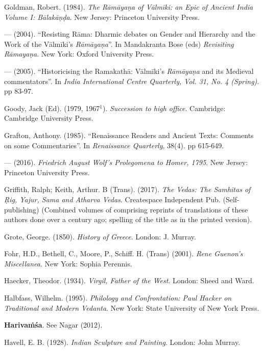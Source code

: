 \begin{thebibliography}{99}
Goldman, Robert. (1984). {\sl The Rāmāyaṇa of Vālmīki: an Epic of Ancient India Volume I: Bālakāṇḍa}. New Jersey: Princeton University Press. 

---  (2004). “Resisting Rāma: Dharmic debates on Gender and Hierarchy and the Work of the Vālmīki’s {\sl Rāmāyaṇa}”. In Mandakranta Bose (eds) {\sl Revisiting Rāmayaṇa}. New York: Oxford University Press. 

--- (2005). “Historicising the Ramakathā: Vālmīki's {\sl Rāmāyaṇa} and its Medieval commentators”. In {\sl India International Centre Quarterly, Vol. 31, No. 4 (Spring)}. pp 83-97.

Goody, Jack (Ed). (1979, 1967$^{1}$). {\sl Succession to high office}. Cambridge: Cambridge University Press. 

Grafton, Anthony. (1985). “Renaissance Readers and Ancient Texts: Comments on some Commentaries”. In {\sl Renaissance Quarterly}, 38(4). pp 615-649.

--- (2016). {\sl Friedrich August Wolf’s Prolegomena to Homer, 1795}.  New Jersey: Princeton University Press. 

Griffith, Ralph; Keith, Arthur. B (Trans). (2017). {\sl The Vedas: The Samhitas of Ṛig, Yajur, Sama and Atharva Vedas}. Createspace Independent Pub. (Self-publishing) (Combined volumes of comprising reprints of translations of these authors done over a century ago; spelling of the title as in the printed version).

Grote, George. (1850). {\sl History of Greece}.  London: J. Murray. 

Fohr, H.D., Bethell, C., Moore, P., Schiff. H. (Trans) (2001). {\sl Rene Guenon’s Miscellanea}. New York: Sophia Perennis. 

Haecker, Theodor. (1934). {\sl Virgil, Father of the West}. London: Sheed and Ward. 

Halbfass, Wilhelm. (1995). {\sl Philology and Confrontation: Paul Hacker on Traditional and Modern Vedanta}. New York: State University of New York Press. 

{\bf Harivaṁśa}. See Nagar (2012). 

Havell, E. B. (1928). {\sl Indian Sculpture and Painting}. London: John Murray. 


\end{thebibliography}
